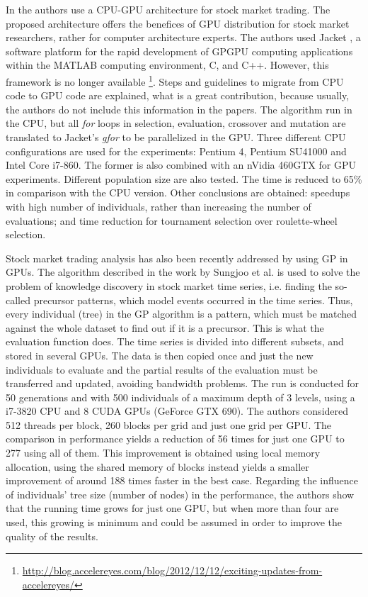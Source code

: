 \documentclass{article}
\begin{document}
In \cite{Contreras:2012:UGA:2150467.2150469} the authors use a CPU-GPU architecture for stock market trading. The proposed architecture offers the benefices of GPU distribution for stock market researchers, rather for computer architecture experts. The authors used Jacket \cite{jacket:Matlab}, a software platform for the rapid development of GPGPU computing applications within the MATLAB computing environment, C, and C++. However, this framework is no longer available \footnote{\url{http://blog.accelereyes.com/blog/2012/12/12/exciting-updates-from-accelereyes/}}. Steps and guidelines to migrate from CPU code to GPU code are explained, what is a great contribution, because usually, the authors do not include this information in the papers. The algorithm run in the CPU, but all  {\em for} loops in selection, evaluation, crossover and mutation are translated to Jacket's {\em gfor} to be parallelized in the GPU. Three different CPU configurations are used for the experiments: Pentium 4, Pentium SU41000 and Intel Core i7-860. The former is also combined with an nVidia 460GTX for GPU experiments. Different population size are also tested. The time is reduced to 65\% in comparison with the CPU version. Other conclusions are obtained: speedups with high number of individuals, rather than increasing the number of evaluations; and time reduction for  tournament selection  over roulette-wheel selection.

Stock market trading analysis has also been recently addressed by
using GP in GPUs. The algorithm described in the work by Sungjoo et
al. \cite{Sungjoo15fastknowledge} is used to solve the problem of
knowledge discovery in stock market time series, i.e. finding the
so-called precursor patterns, which model events occurred in the time
series. Thus, every individual (tree) in the GP algorithm is a
pattern, which must be matched against the whole dataset to find
out if it is a precursor. This is what the evaluation function
does. The time series is divided into different subsets, and stored in
several GPUs. The data is then copied once and just the new
individuals to evaluate and the partial results of the evaluation must
be transferred and updated, avoiding bandwidth problems.
The run is conducted for 50 generations and with 500 individuals of a maximum depth of 3 levels, using a i7-3820 CPU and 8 CUDA GPUs (GeForce GTX 690).
The authors considered
512 threads per block, 260 blocks per grid and just one grid per
GPU. The comparison in performance yields a reduction of 56 times for
just one GPU to 277 using all of them. This improvement is obtained using
local memory allocation, using the shared memory of blocks instead
yields a smaller improvement of around 188 times faster in the best
case. Regarding the influence of individuals' tree size (number of
nodes) in the performance, the authors show that the running time
grows for just one GPU, but when more than four are used, this growing
is minimum and could be assumed in order to improve the quality of the
results. %
\end{document}
